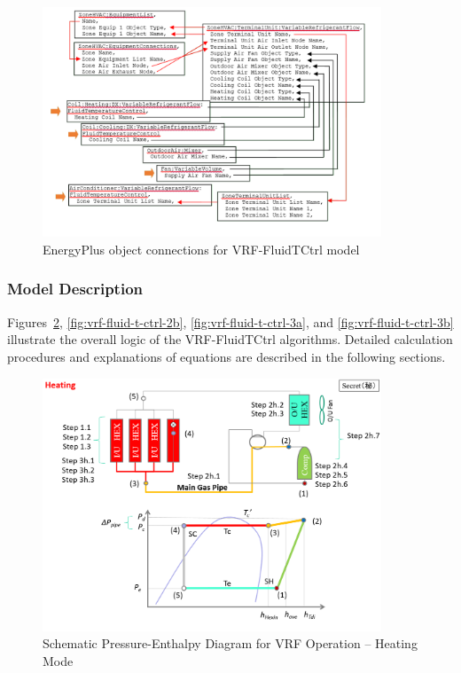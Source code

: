 \begin{figure}[hbtp] %
\centering
\includegraphics[width=0.9\textwidth, height=0.9\textheight, keepaspectratio=true]{media/VRF-FluidTCtrl-1b.png}
\caption{EnergyPlus object connections for VRF-FluidTCtrl model \label{fig:energyplus-object-connections-for-vrf-fluidtctrl-model}}
\end{figure}

\subsubsection{Model Description}\label{vrf-heat-pump-model-description}

Figures~\ref{fig:vrf-fluid-t-ctrl-2a}, \ref{fig:vrf-fluid-t-ctrl-2b}, \ref{fig:vrf-fluid-t-ctrl-3a}, and \ref{fig:vrf-fluid-t-ctrl-3b} illustrate the overall logic of the VRF-FluidTCtrl algorithms. Detailed calculation procedures and explanations of equations are described in the following sections.

\begin{figure}[hbtp] %
\centering
\includegraphics[width=0.9\textwidth, height=0.9\textheight, keepaspectratio=true]{media/VRF-FluidTCtrl-2a.png}
\caption{Schematic Pressure-Enthalpy Diagram for VRF Operation -- Heating Mode \label{fig:vrf-fluid-t-ctrl-2a}}
\end{figure}

